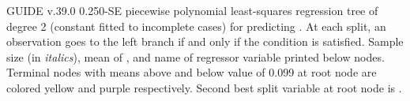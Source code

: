 \documentclass[12pt]{article}
\begin{document}
 \begin{center}
 \end{center}
GUIDE v.39.0 0.250-SE
 piecewise polynomial least-squares regression tree
 of degree 2
 (constant fitted to incomplete cases)
for predicting \texttt{}.
At each split, an observation goes to the left branch 
 if and only if the condition is satisfied.
Sample size (in \emph{italics}), mean of \texttt{}, and name of regressor variable printed below nodes.
 Terminal nodes with means above and below value of  0.099  at root node are colored yellow and purple respectively.
 Second best split variable at root node is \texttt{}.
 
\end{document}
